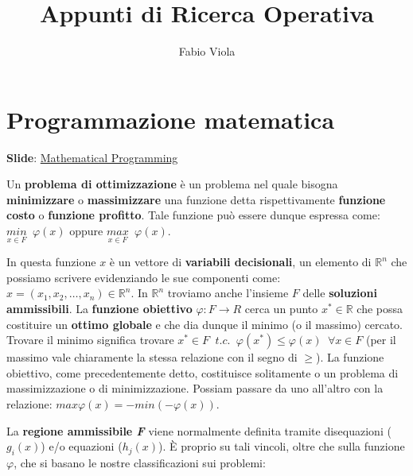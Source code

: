 \documentclass[11pt]{book}
\title{Appunti di Ricerca Operativa}
\author{Fabio Viola}
\date{}
\begin{document}
\chapter{Programmazione matematica}

\scriptsize
{\bf Slide}:
\href{http://www.or.deis.unibo.it/staff_pages/martello/Chapter2.zip}{Mathematical
Programming}
\normalsize
\vspace{20pt}

Un {\bf problema di ottimizzazione} \`e un problema nel quale bisogna
{\bf minimizzare} o {\bf massimizzare} una funzione detta
rispettivamente {\bf funzione costo} o {\bf funzione profitto}. Tale
funzione pu\`o essere dunque espressa come: $\underset{x \in
  F}{min}\phantom{a}\varphi(x)$ oppure $\underset{x \in
  F}{max}\phantom{a}\varphi(x)$.

In questa funzione $x$ \`e un vettore di {\bf variabili decisionali},
un elemento di $\mathbb{R}^n$ che possiamo scrivere evidenziando le
sue componenti come: $x = (x_1,x_2,\dots,x_n) \in \mathbb{R}^n$.  In
$\mathbb{R}^n$ troviamo anche l'insieme $F$ delle {\bf soluzioni
  ammissibili}. La {\bf funzione obiettivo} $\varphi:F\rightarrow R$
cerca un punto $x^* \in \mathbb{R}$ che possa costituire un {\bf
  ottimo globale} e che dia dunque il minimo (o il massimo) cercato.
Trovare il minimo significa trovare $x^* \in
F\phantom{a}t.c.\phantom{a}\varphi(x^*) \leq
\varphi(x)\phantom{a}\forall x \in F$ (per il massimo vale chiaramente
la stessa relazione con il segno di $\geq$). La funzione obiettivo,
come precedentemente detto, costituisce solitamente o un problema di
massimizzazione o di minimizzazione. Possiam passare da uno all'altro
con la relazione: $max \varphi(x) = -min(-\varphi(x))$.

La {\bf regione ammissibile {\em F}} viene normalmente definita
tramite disequazioni ($g_i(x)$) e/o equazioni ($h_j(x)$). \`E proprio
su tali vincoli, oltre che sulla funzione $\varphi$, che si basano le
nostre classificazioni sui problemi:
\end{document}
